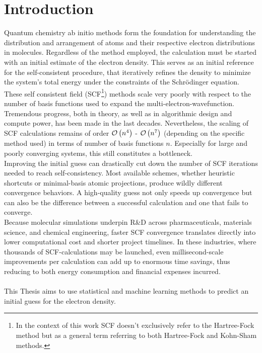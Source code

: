 \chapter{Introduction}
\label{sec:introduction}

Quantum chemistry ab initio methods form the foundation for understanding the distribution and arrangement of atoms and their respective electron distributions in molecules. Regardless of the method employed, the calculation must be started with an initial estimate of the electron density. This serves as an initial reference for the self-consistent procedure, that iteratively refines the density to minimize the system's total energy under the constraints of the Schrödinger equation. These self consistent field (SCF\footnote{In the context of this work SCF doesn't exclusively refer to the Hartree-Fock method but as a general term referring to both Hartree-Fock and Kohn-Sham methods.}) methods scale very poorly with respect to the number of basis functions used to expand the multi-electron-wavefunction. Tremendous progress, both in theory, as well as in algorithmic design and compute power, has been made in the last decades. Nevertheless, the scaling of SCF calculations remains of order $\mathcal{O}\left(n^4\right)$ - $\mathcal{O}\left(n^7\right)$ (depending on the specific method used) in terms of number of basis functions $n$. Especially for large and poorly converging systems, this still constitutes a bottleneck. \\

Improving the initial guess can drastically cut down the number of SCF iterations needed to reach self-consistency. Most available schemes, whether heuristic shortcuts or minimal-basis atomic projections, produce wildly different convergence behaviors. A high-quality guess not only speeds up convergence but can also be the difference between a successful calculation and one that fails to converge.\\
Because molecular simulations underpin R\&D across pharmaceuticals, materials science, and chemical engineering, faster SCF convergence translates directly into lower computational cost and shorter project timelines. In these industries, where thousands of SCF-calculations may be launched, even millisecond-scale improvements per calculation can add up to enormous time savings, thus reducing to  both energy consumption and financial expenses incurred. \\
\\
This Thesis aims to use statistical and machine learning methods to predict an initial guess for the electron density. 


